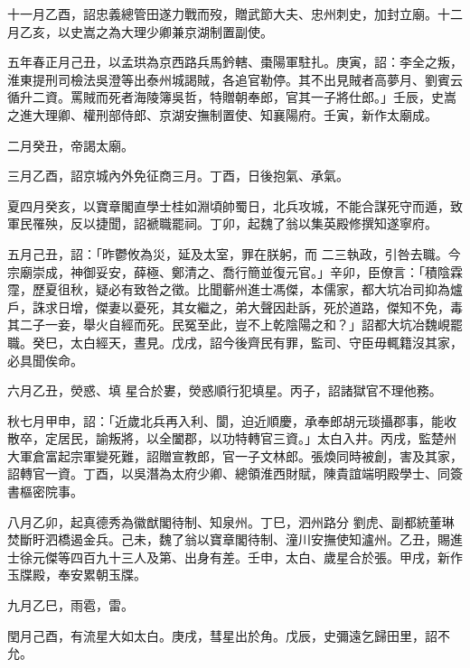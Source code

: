 \begin{pinyinscope}
 十一月乙酉，詔忠義總管田遂力戰而歿，贈武節大夫、忠州刺史，加封立廟。十二月乙亥，以史嵩之為大理少卿兼京湖制置副使。



 五年春正月己丑，以孟珙為京西路兵馬鈐轄、棗陽軍駐扎。庚寅，詔：李全之叛，淮東提刑司檢法吳澄等出泰州城謁賊，各追官勒停。其不出見賊者高夢月、劉賓云
 循升二資。罵賊而死者海陵簿吳哲，特贈朝奉郎，官其一子將仕郎。」壬辰，史嵩之進大理卿、權刑部侍郎、京湖安撫制置使、知襄陽府。壬寅，新作太廟成。



 二月癸丑，帝謁太廟。



 三月乙酉，詔京城內外免征商三月。丁酉，日後抱氣、承氣。



 夏四月癸亥，以寶章閣直學士桂如淵頃帥蜀日，北兵攻城，不能合謀死守而遁，致軍民罹殃，反以捷聞，詔褫職罷祠。丁卯，起魏了翁以集英殿修撰知遂寧府。



 五月己丑，詔：「昨鬱攸為災，延及太室，罪在朕躬，而
 二三執政，引咎去職。今宗廟崇成，神御妥安，薛極、鄭清之、喬行簡並復元官。」辛卯，臣僚言：「積陰霖霪，歷夏徂秋，疑必有致咎之徵。比聞蘄州進士馮傑，本儒家，都大坑冶司抑為爐戶，誅求日增，傑妻以憂死，其女繼之，弟大聲因赴訴，死於道路，傑知不免，毒其二子一妾，舉火自經而死。民冤至此，豈不上乾陰陽之和？」詔都大坑冶魏峴罷職。癸巳，太白經天，晝見。戊戌，詔今後齊民有罪，監司、守臣毋輒籍沒其家，必具聞俟命。



 六月乙丑，熒惑、填
 星合於婁，熒惑順行犯填星。丙子，詔諸獄官不理他務。



 秋七月甲申，詔：「近歲北兵再入利、閬，迫近順慶，承奉郎胡元琰攝郡事，能收散卒，定居民，諭叛將，以全闔郡，以功特轉官三資。」太白入井。丙戌，監楚州大軍倉富起宗軍變死難，詔贈宣教郎，官一子文林郎。張煥同時被創，害及其家，詔轉官一資。丁酉，以吳潛為太府少卿、總領淮西財賦，陳貴誼端明殿學士、同簽書樞密院事。



 八月乙卯，起真德秀為徽猷閣待制、知泉州。丁巳，泗州路分
 劉虎、副都統董琳焚斷盱泗橋遏金兵。己未，魏了翁以寶章閣待制、潼川安撫使知瀘州。乙丑，賜進士徐元傑等四百九十三人及第、出身有差。壬申，太白、歲星合於張。甲戌，新作玉牒殿，奉安累朝玉牒。



 九月乙巳，雨雹，雷。



 閏月己酉，有流星大如太白。庚戌，彗星出於角。戊辰，史彌遠乞歸田里，詔不允。




\end{pinyinscope}
